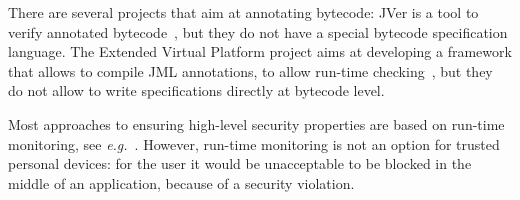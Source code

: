 There are several projects that aim at annotating bytecode: JVer is a
tool to verify annotated bytecode~\cite{ChanderEILN05}, but they do
not have a special bytecode specification language.  The Extended
Virtual Platform project aims at developing a framework that allows to
compile JML annotations, to allow run-time
checking~\cite{AlagicR05}, but they do not allow to write
specifications directly at bytecode level.

Most approaches to ensuring high-level security properties are based
on run-time monitoring, see
\emph{e.g.}~\/\cite{bartetzko01assertions,Schneider99,Erlingsson03,ColcombetF00}. However,
run-time monitoring is not an option for trusted personal devices: for
the user it would be unacceptable to be blocked in the middle of an
application, because of a security violation.


